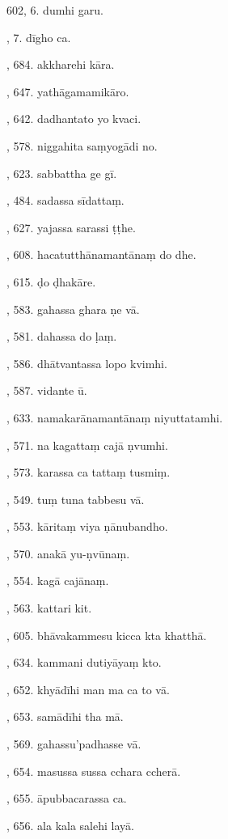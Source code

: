 602, 6. dumhi garu.\par {}, 7. dīgho ca.\par {}, 684. akkharehi kāra.\par {}, 647. yathāgamamikāro.\par {}, 642. dadhantato yo kvaci.\par {}, 578. niggahita saṃyogādi no.\par {}, 623. sabbattha ge gī.\par {}, 484. sadassa sīdattaṃ.\par {}, 627. yajassa sarassi ṭṭhe.\par {}, 608. hacatutthānamantānaṃ do dhe.\par {}, 615. ḍo ḍhakāre.\par {}, 583. gahassa ghara ṇe vā.\par {}, 581. dahassa do ḷaṃ.\par {}, 586. dhātvantassa lopo kvimhi.\par {}, 587. vidante ū.\par {}, 633. namakarānamantānaṃ niyuttatamhi.\par {}, 571. na kagattaṃ cajā ṇvumhi.\par {}, 573. karassa ca tattaṃ tusmiṃ.\par {}, 549. tuṃ tuna tabbesu vā.\par {}, 553. kāritaṃ viya ṇānubandho.\par {}, 570. anakā yu-ṇvūnaṃ.\par {}, 554. kagā cajānaṃ.\par {}, 563. kattari kit.\par {}, 605. bhāvakammesu kicca kta khatthā.\par {}, 634. kammani dutiyāyaṃ kto.\par {}, 652. khyādīhi man ma ca to vā.\par {}, 653. samādīhi tha mā.\par {}, 569. gahassu’padhasse vā.\par {}, 654. masussa sussa cchara ccherā.\par {}, 655. āpubbacarassa ca.\par {}, 656. ala kala salehi layā.\par \noindent
